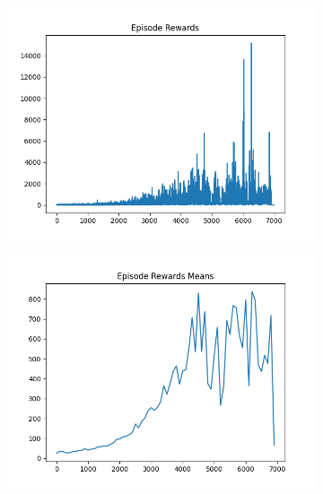 \begin{figure}[H]
\begin{subfigure}{.47\linewidth}
        \includegraphics[width=\textwidth]{pole/2024-06-15_00-29-02_dqn_cartpole_episode_rewards.png}
    \end{subfigure}
    \begin{subfigure}{.47\linewidth}
        \centering
        \includegraphics[width=\textwidth]{pole/2024-06-15_00-29-02_dqn_cartpole_episode_rewards_means.png}
    \end{subfigure}
\end{figure}
